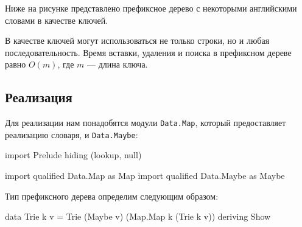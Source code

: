 Ниже на рисунке представлено префиксное дерево с некоторыми английскими словами в качестве ключей.
\begin{center}
\end{center}

В качестве ключей могут использоваться не только строки, но и любая последовательность. Время вставки, удаления и поиска в префиксном дереве равно $O(m)$, где $m$ — длина ключа.

\subsection{Реализация}
Для реализации нам понадобятся модули \lstinline{Data.Map}, который предоставляет реализацию словаря, и \lstinline{Data.Maybe}:
\begin{hslst}{}{}
import Prelude hiding (lookup, null)

import qualified Data.Map as Map
import qualified Data.Maybe as Maybe
\end{hslst}

Тип префиксного дерева определим следующим образом:
\begin{hslst}{}{}
data Trie k v = Trie (Maybe v) (Map.Map k (Trie k v))
                deriving Show
\end{hslst}

